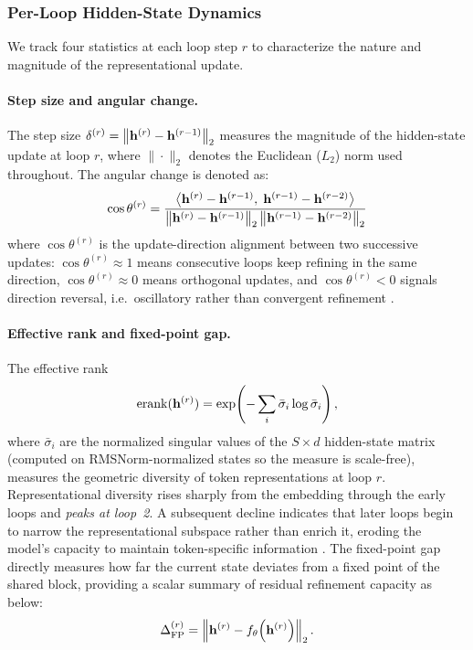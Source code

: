 \subsubsection{Per-Loop Hidden-State Dynamics}
\label{sec:analysis-dynamics}

We track four statistics at each loop step $r$ to characterize the nature
and magnitude of the representational update.

\paragraph{Step size and angular change.}
The step size $\delta^{(r)} = \left\|\mathbf{h}^{(r)} - \mathbf{h}^{(r-1)}\right\|_2$ measures the magnitude of the hidden-state update at loop $r$, where
$\|\cdot\|_2$ denotes the Euclidean ($L_2$) norm used throughout.
The angular change is denoted as:
\begin{equation}
  \cos\theta^{(r)} = \frac{
    \left\langle \mathbf{h}^{(r)} - \mathbf{h}^{(r-1)},\;
                  \mathbf{h}^{(r-1)} - \mathbf{h}^{(r-2)} \right\rangle
  }{\left\|\mathbf{h}^{(r)} - \mathbf{h}^{(r-1)}\right\|_2
    \left\|\mathbf{h}^{(r-1)} - \mathbf{h}^{(r-2)}\right\|_2}
  \label{eq:angular}
\end{equation} where $\cos\theta^{(r)}$ is the update-direction alignment between two successive updates: $\cos\theta^{(r)}\!\approx\!1$ means consecutive loops keep refining in the same direction, $\cos\theta^{(r)}\!\approx\!0$ means orthogonal updates, and $\cos\theta^{(r)}\!<\!0$ signals direction reversal, i.e.\ oscillatory rather than convergent refinement \citep{pappone2025twoscale}.

\paragraph{Effective rank and fixed-point gap.}
The effective rank
\begin{equation}
  \mathrm{erank}(\mathbf{h}^{(r)}) =
  \exp\!\left(-\sum_i \bar\sigma_i \log \bar\sigma_i\right),
  \label{eq:erank}
\end{equation}
where $\bar\sigma_i$ are the normalized singular values of the $S \times d$
hidden-state matrix (computed on RMSNorm-normalized states so the measure is
scale-free), measures the geometric diversity of token representations at
loop $r$.
Representational diversity rises sharply from the embedding through the early
loops and \emph{peaks at loop~2}. A subsequent decline indicates that later
loops begin to narrow the representational subspace rather than enrich it,
eroding the model's capacity to maintain token-specific information
\citep{chen2026loop}.
The fixed-point gap directly measures how far the current state deviates from a fixed point of the shared block, providing a scalar summary of residual refinement capacity as below:
\begin{equation}
  \Delta_{\text{FP}}^{(r)} =
  \left\|\mathbf{h}^{(r)} - f_\theta\!\left(\mathbf{h}^{(r)}\right)\right\|_2.
  \label{eq:fpgap}
\end{equation}

